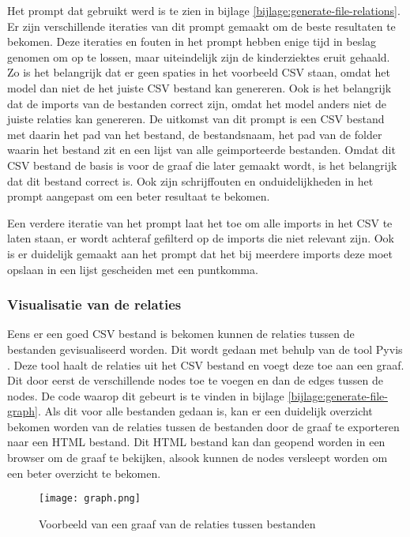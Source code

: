 Het prompt dat gebruikt werd is te zien in bijlage \ref{bijlage:generate-file-relations}.
Er zijn verschillende iteraties van dit prompt gemaakt om de beste resultaten te bekomen.
Deze iteraties en fouten in het prompt hebben enige tijd in beslag genomen om op te lossen, maar uiteindelijk zijn de kinderziektes eruit gehaald.
Zo is het belangrijk dat er geen spaties in het voorbeeld CSV staan, omdat het model dan niet de het juiste CSV bestand kan genereren.
Ook is het belangrijk dat de imports van de bestanden correct zijn, omdat het model anders niet de juiste relaties kan genereren. 
De uitkomst van dit prompt is een CSV bestand met daarin het pad van het bestand, de bestandsnaam, het pad van de folder waarin het bestand zit en een lijst van alle geimporteerde bestanden.
Omdat dit CSV bestand de basis is voor de graaf die later gemaakt wordt, is het belangrijk dat dit bestand correct is.
Ook zijn schrijffouten en onduidelijkheden in het prompt aangepast om een beter resultaat te bekomen.

Een verdere iteratie van het prompt laat het toe om alle imports in het CSV te laten staan, er wordt achteraf gefilterd op de imports die niet relevant zijn.
Ook is er duidelijk gemaakt aan het prompt dat het bij meerdere imports deze moet opslaan in een lijst gescheiden met een puntkomma.

\subsubsection{Visualisatie van de relaties}
\label{subsec:project-documentatie-relaties-visualisatie}

Eens er een goed CSV bestand is bekomen kunnen de relaties tussen de bestanden gevisualiseerd worden.
Dit wordt gedaan met behulp van de tool Pyvis \autocite{WHIR2018}.
Deze tool haalt de relaties uit het CSV bestand en voegt deze toe aan een graaf. 
Dit door eerst de verschillende nodes toe te voegen en dan de edges tussen de nodes. 
De code waarop dit gebeurt is te vinden in bijlage \ref{bijlage:generate-file-graph}.
Als dit voor alle bestanden gedaan is, kan er een duidelijk overzicht bekomen worden van de relaties tussen de bestanden door de graaf te exporteren naar een HTML bestand.
Dit HTML bestand kan dan geopend worden in een browser om de graaf te bekijken, alsook kunnen de nodes versleept worden om een beter overzicht te bekomen.

\begin{figure}[h]
    \centering
    \texttt{[image: graph.png]}
    \caption{Voorbeeld van een graaf van de relaties tussen bestanden}
    \label{fig:graph}
\end{figure}

